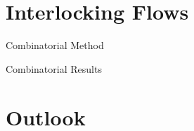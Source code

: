 \documentclass{beamer}
\numberwithin{equation}{aufgabe}
\begin{document}
\section{Interlocking Flows}
\begin{frame}{Combinatorial Method}
    
\end{frame}

\begin{frame}{Combinatorial Results}
    
\end{frame}

\section{Outlook}

\begin{frame}
    
\end{frame}

\appendix
\begin{frame}    
\printbibliography 
\end{frame}
\end{document}
